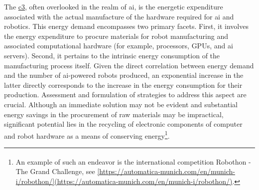 \documentclass[12pt]{article}
\begin{document}
The \underline{\ac{c3}}, often overlooked in the realm of \ac{ai}, is the energetic expenditure associated with the actual manufacture of the hardware required for \ac{ai} and robotics. This energy demand encompasses two primary facets. First, it involves the energy expenditure to procure materials for robot manufacturing and associated computational hardware (for example, processors, GPUs, and \ac{ai} servers). Second, it pertains to the intrinsic energy consumption of the manufacturing process itself. Given the direct correlation between energy demand and the number of \ac{ai}-powered robots produced, an exponential increase in the latter directly corresponds to the increase in the energy consumption for their production. Assessment and formulation of strategies to address this aspect are crucial. Although an immediate solution may not be evident and substantial energy savings in the procurement of raw materials may be impractical, significant potential lies in the recycling of electronic components of computer and robot hardware as a means of conserving energy\footnote{An example of such an endeavor is the international competition Robothon\textsuperscript{\textregistered} - The Grand Challenge, see \url{[https://automatica-munich.com/en/munich-i/robothon/](https://automatica-munich.com/en/munich-i/robothon/)}.}.
\end{document}
